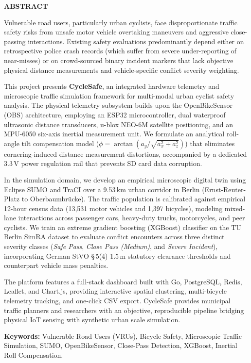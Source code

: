 \begin{center}
	\fontsize{16pt}{22pt}\selectfont \textbf{\MakeUppercase{Abstract}}
\end{center}
\vspace{0.5cm}

\noindent Vulnerable road users, particularly urban cyclists, face disproportionate traffic safety risks from unsafe motor vehicle overtaking maneuvers and aggressive close-passing interactions. Existing safety evaluations predominantly depend either on retrospective police crash records (which suffer from severe under-reporting of near-misses) or on crowd-sourced binary incident markers that lack objective physical distance measurements and vehicle-specific conflict severity weighting.

\noindent This project presents \textbf{CycleSafe}, an integrated hardware telemetry and microscopic traffic simulation framework for multi-modal urban cyclist safety analysis. The physical telemetry subsystem builds upon the OpenBikeSensor (OBS) architecture, employing an ESP32 microcontroller, dual waterproof ultrasonic distance transducers, u-blox NEO-6M satellite positioning, and an MPU-6050 six-axis inertial measurement unit. We formulate an analytical roll-angle tilt compensation model ($\phi = \arctan(a_y / \sqrt{a_x^2 + a_z^2})$) that eliminates cornering-induced distance measurement distortions, accompanied by a dedicated 3.3\,V power regulation rail that prevents SD card data corruption. 

\noindent In the simulation domain, we develop an empirical microscopic digital twin using Eclipse SUMO and TraCI over a 9.53\,km urban corridor in Berlin (Ernst-Reuter-Platz to Oberbaumbr{\"u}cke). The traffic population is calibrated against empirical 12-hour census data (13,531 motor vehicles and 1,397 bicycles), modeling mixed-lane interactions across passenger cars, heavy-duty trucks, motorcycles, and peer cyclists. We train an extreme gradient boosting (XGBoost) classifier on the TU Berlin SimRA dataset to evaluate conflict encounters across three distinct severity classes (\textit{Safe Pass}, \textit{Close Pass (Medium)}, and \textit{Severe Incident}), incorporating German StVO \S\,5(4) 1.5\,m statutory clearance thresholds and counterpart vehicle mass penalties. 

\noindent The platform features a full-stack dashboard built with Go, PostgreSQL, Redis, Leaflet, and Chart.js, providing interactive spatial clustering, multi-bicycle telemetry tracking, and one-click CSV export. CycleSafe provides municipal traffic planners and researchers with an objective, reproducible pipeline bridging physical IoT sensing with synthetic urban scale simulation.

\vspace{0.8cm}
\noindent \textbf{Keywords:} Vulnerable Road Users (VRUs), Bicycle Safety, Microscopic Traffic Simulation, SUMO, OpenBikeSensor, Close-Pass Detection, XGBoost, Inertial Roll Compensation.
